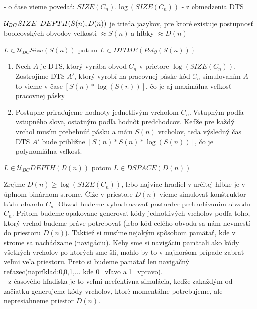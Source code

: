- o čase vieme povedať: $SIZE(C_n).\log(SIZE(C_n))$ - z obmedzenia DTS

\begin{oznacenie}
  $\mathcal{U}_{BC}SIZE \enspace DEPTH(S(n),D(n))$ je trieda jazykov, pre ktoré existuje
  postupnosť booleovských obvodov veľkosti $\approx S(n)$ a hĺbky $\approx D(n)$
\end{oznacenie}

\begin{veta}\label{Veta1}
  $L\in \mathcal{U}_{BC}Size(S(n))$ potom $L\in DTIME(Poly(S(n)))$
\end{veta}

\begin{dokaz}
  \begin{enumerate}
    \item Nech $A$ je DTS, ktorý vyrába obvod $C_n$ v prietore
      $\log(SIZE(C_n))$. Zostrojíme DTS $A'$,
      ktorý vyrobí na pracovnej páske kód $C_n$ simulovaním $A$ -
      to vieme v čase $[S(n)*\log(S(n))]$,
      čo je aj maximálna veľkosť pracovnej pásky
    \item Postupne priraďujeme hodnoty jednotlivým vrcholom $C_n$.
      Vstupným podľa vstupného slova, ostatným podľa hodnôt predchodcov.
      Keďže pre každý vrchol musím prebehnúť pásku a mám $S(n)$ vrcholov,
      teda výsledný čas DTS $A'$ bude približne $[S(n)*S(n)*\log(S(n))]$,
      čo je polynomiálna veľkosť.
  \end{enumerate}
\end{dokaz}

\begin{veta}
  \label{Veta2}
  $L\in \mathcal{U}_{BC}DEPTH(D(n))$ potom $L\in DSPACE(D(n))$
\end{veta}

\begin{dokaz}
  Zrejme $D(n)\geq \log(SIZE(C_n))$,
  lebo najviac hradiel v určitej hĺbke je v úplnom binárnom strome.
  Čiže v priestore $D(n)$ vieme simulovať konštruktor kódu obvodu $C_n$.
  Obvod budeme vyhodnocovať postorder prehľadávaním obvodu $C_n$.
  Pritom budeme opakovane generovať kódy jednotlivých vrcholov podľa toho,
  ktorý vrchol budeme práve potrebovať
  (lebo kód celého obvodu sa nám nevmestí do priestoru $D(n)$).
  Taktiež si musíme nejakým spôsobom pamätať,
  kde v strome sa nachádzame (navigáciu).
  Keby sme si navigáciu pamätali ako kódy všetkých vrcholov po ktorých sme šli,
  mohlo by to v najhoršom prípade zabrať veľmi veľa priestoru.
  Preto si budeme pamätať len navigačný reťazec(napríklad:0,0,1,...
  kde 0=vľavo a 1=vpravo).\\
  - z časového hľadiska je to veľmi neefektívna simulácia,
  keďže zakaždým od začiatku generujeme kódy vrcholov,
  ktoré momentálne potrebujeme, ale nepresiahneme priestor $D(n)$.
\end{dokaz}

